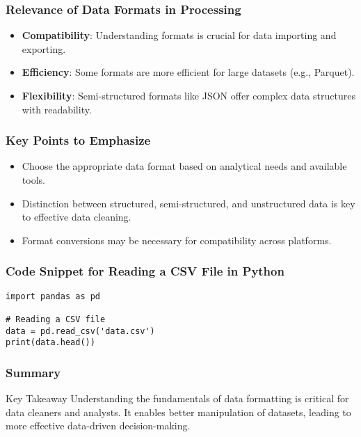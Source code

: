 \documentclass[aspectratio=169]{beamer}
\begin{document}
\begin{frame}[fragile]
    \frametitle{Relevance of Data Formats in Processing}
    \begin{itemize}
        \item \textbf{Compatibility}: Understanding formats is crucial for data importing and exporting.
        \item \textbf{Efficiency}: Some formats are more efficient for large datasets (e.g., Parquet).
        \item \textbf{Flexibility}: Semi-structured formats like JSON offer complex data structures with readability.
    \end{itemize}
\end{frame}

\begin{frame}[fragile]
    \frametitle{Key Points to Emphasize}
    \begin{itemize}
        \item Choose the appropriate data format based on analytical needs and available tools.
        \item Distinction between structured, semi-structured, and unstructured data is key to effective data cleaning.
        \item Format conversions may be necessary for compatibility across platforms.
    \end{itemize}
\end{frame}

\begin{frame}[fragile]
    \frametitle{Code Snippet for Reading a CSV File in Python}
    \begin{lstlisting}[basicstyle=\ttfamily]
import pandas as pd

# Reading a CSV file
data = pd.read_csv('data.csv')
print(data.head())
    \end{lstlisting}
\end{frame}

\begin{frame}[fragile]
    \frametitle{Summary}
    \begin{block}{Key Takeaway}
        Understanding the fundamentals of data formatting is critical for data cleaners and analysts. It enables better manipulation of datasets, leading to more effective data-driven decision-making.
    \end{block}
\end{frame}
\end{document}
